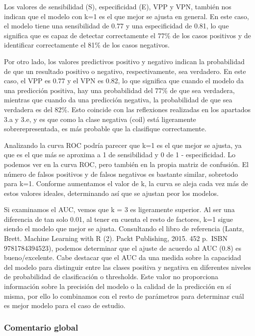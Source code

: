 \documentclass[
]{article}
\begin{document}
Los valores de sensibilidad (S), especificidad (E), VPP y VPN, también
nos indican que el modelo con k=1 es el que mejor se ajusta en general.
En este caso, el modelo tiene una sensibilidad de 0.77 y una
especificidad de 0.81, lo que significa que es capaz de detectar
correctamente el 77\% de los casos positivos y de identificar
correctamente el 81\% de los casos negativos.

Por otro lado, los valores predictivos positivo y negativo indican la
probabilidad de que un resultado positivo o negativo, respectivamente,
sea verdadero. En este caso, el VPP es 0.77 y el VPN es 0.82, lo que
significa que cuando el modelo da una predicción positiva, hay una
probabilidad del 77\% de que sea verdadera, mientras que cuando da una
predicción negativa, la probabilidad de que sea verdadera es del 82\%.
Esto coincide con las reflexiones realizadas en los apartados 3.a y 3.e,
y es que como la clase negativa (coil) está ligeramente
sobrerepresentada, es más probable que la clasifique correctamente.

Analizando la curva ROC podría parecer que k=1 es el que mejor se
ajusta, ya que es el que más se aproxima a 1 de sensibilidad y 0 de 1 -
especificidad. Lo podemos ver en la curva ROC, pero también en la propia
matriz de confusión. El número de falsos positivos y de falsos negativos
es bastante similar, sobretodo para k=1. Conforme aumentamos el valor de
k, la curva se aleja cada vez más de estos valores ideales, determinando
así que se ajustan peor los modelos.

Si examinamos el AUC, vemos que k = 3 es ligeramente superior. Al ser
una diferencia de tan solo 0.01, al tener en cuenta el resto de
factores, k=1 sigue siendo el modelo que mejor se ajusta. Consultando el
libro de referencia (Lantz, Brett. Machine Learning with R (2). Packt
Publishing, 2015. 452 p.~ISBN 9781784394523), podemos determinar que el
ajuste de acuerdo al AUC (0.8) es bueno/excelente. Cabe destacar que el
AUC da una medida sobre la capacidad del modelo para distinguir entre
las clases positiva y negativa en diferentes niveles de probabilidad de
clasificación o thresholds. Este valor no proporciona información sobre
la precisión del modelo o la calidad de la predicción en sí misma, por
ello lo combinamos con el resto de parámetros para determinar cuál es
mejor modelo para el caso de estudio.

\hypertarget{comentario-global}{%
\subsubsection{Comentario global}\label{comentario-global}}
\end{document}
